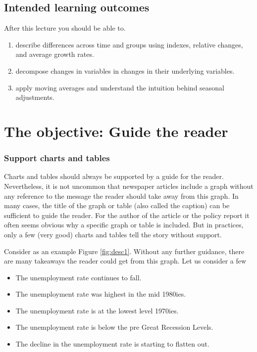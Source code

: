 \documentclass[]{book}
\providecommand{\tightlist}{%
  \setlength{\itemsep}{0pt}\setlength{\parskip}{0pt}}
\begin{document}
\hypertarget{intended-learning-outcomes-8}{%
\subsection{Intended learning outcomes}\label{intended-learning-outcomes-8}}

After this lecture you should be able to.

\begin{enumerate}
\def\labelenumi{\arabic{enumi}.}
\tightlist
\item
  describe differences across time and groups using indexes, relative changes, and average growth rates.
\item
  decompose changes in variables in changes in their underlying variables.
\item
  apply moving averages and understand the intuition behind seasonal adjustments.
\end{enumerate}

\hypertarget{the-objective-guide-the-reader}{%
\section{The objective: Guide the reader}\label{the-objective-guide-the-reader}}

\hypertarget{support-charts-and-tables}{%
\subsubsection*{Support charts and tables}\label{support-charts-and-tables}}

Charts and tables should always be supported by a guide for the reader. Nevertheless, it is not uncommon that newspaper articles include a graph without any reference to the message the reader should take away from this graph. In many cases, the title of the graph or table (also called the caption) can be sufficient to guide the reader. For the author of the article or the policy report it often seems obvious why a specific graph or table is included. But in practices, only a few (very good) charts and tables tell the story without support.

Consider as an example Figure \ref{fig:desc1}. Without any further guidance, there are many takeaways the reader could get from this graph. Let us consider a few

\begin{itemize}
\tightlist
\item
  The unemployment rate continues to fall.
\item
  The unemployment rate was highest in the mid 1980ies.
\item
  The unemployment rate is at the lowest level 1970ies.
\item
  The unemployment rate is below the pre Great Recession Levels.
\item
  The decline in the unemployment rate is starting to flatten out.
\end{itemize}
\end{document}
